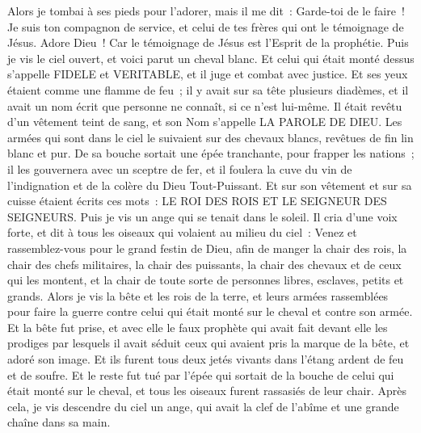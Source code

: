 \begin{multicols}{2}
Alors je tombai à ses pieds pour l'adorer, mais il me dit~: Garde-toi de le faire~! Je suis ton compagnon de service, et celui de tes frères qui ont le témoignage de Jésus. Adore Dieu~! Car le témoignage de Jésus est l'Esprit de la prophétie.
Puis je vis le ciel ouvert, et voici parut un cheval blanc. Et celui qui était monté dessus s'appelle FIDELE et VERITABLE, et il juge et combat avec justice.
Et ses yeux étaient comme une flamme de feu~; il y avait sur sa tête plusieurs diadèmes, et il avait un nom écrit que personne ne connaît, si ce n'est lui-même.
Il était revêtu d'un vêtement teint de sang, et son Nom s'appelle LA PAROLE DE DIEU.
Les armées qui sont dans le ciel le suivaient sur des chevaux blancs, revêtues de fin lin blanc et pur.
De sa bouche sortait une épée tranchante, pour frapper les nations~; il les gouvernera avec un sceptre de fer, et il foulera la cuve du vin de l'indignation et de la colère du Dieu Tout-Puissant.
Et sur son vêtement et sur sa cuisse étaient écrits ces mots~: LE ROI DES ROIS ET LE SEIGNEUR DES SEIGNEURS.
Puis je vis un ange qui se tenait dans le soleil. Il cria d'une voix forte, et dit à tous les oiseaux qui volaient au milieu du ciel~: Venez et rassemblez-vous pour le grand festin de Dieu,
afin de manger la chair des rois, la chair des chefs militaires, la chair des puissants, la chair des chevaux et de ceux qui les montent, et la chair de toute sorte de personnes libres, esclaves, petits et grands.
Alors je vis la bête et les rois de la terre, et leurs armées rassemblées pour faire la guerre contre celui qui était monté sur le cheval et contre son armée.
Et la bête fut prise, et avec elle le faux prophète qui avait fait devant elle les prodiges par lesquels il avait séduit ceux qui avaient pris la marque de la bête, et adoré son image. Et ils furent tous deux jetés vivants dans l'étang ardent de feu et de soufre.
Et le reste fut tué par l'épée qui sortait de la bouche de celui qui était monté sur le cheval, et tous les oiseaux furent rassasiés de leur chair.
\VerseOne{}Après cela, je vis descendre du ciel un ange, qui avait la clef de l'abîme et une grande chaîne dans sa main.

\end{multicols}
